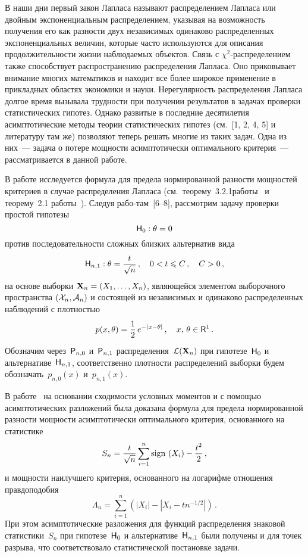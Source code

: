 \begin{multicols}{2}
В наши дни первый закон Лапласа называют
распределением Лапласа или двойным экспоненциальным распределением,
указывая на возможность получения его как разности двух независимых
одинаково распределенных экспоненциальных величин, которые часто
используются для описания продолжительности жизни наблюдаемых
объектов. Связь с $\chi^2$-распределением также способствует
распространению распределения Лапласа. Оно приковывает внимание
многих математиков и находит все более широкое применение в
прикладных областях экономики и науки. Нерегулярность распределения
Лапласа долгое время вызывала трудности при получении результатов в
задачах проверки статистических гипотез. Однако развитые в последние
десятилетия асимптотические методы теории статистических гипотез
(см.~[1, 2, 4, 5] и литературу там же) позволяют теперь решать многие
из таких задач. Одна из них~--- задача о потере мощности
асимптотически оптимального критерия~--- рас\-смат\-ри\-ва\-ет\-ся в данной
работе.

В работе исследуется формула для предела нормированной разности
мощностей критериев в случае распределения Лапласа (см.\
теорему~3.2.1\linebreak работы~\cite{1ben} и теорему~2.1 работы~\cite{2ben}). Следуя
рабо-\linebreak там~[6--8],
рассмотрим задачу проверки простой гипотезы
\begin{equation}
{\sf H}_0:\theta=0  
\label{e1.1}
\end{equation}
против последовательности сложных близких альтернатив вида
\begin{equation*}
{\sf H}_{n,1}: \theta = \displaystyle\frac{\displaystyle t\mathstrut}{\displaystyle \sqrt{n}\mathstrut}\,,\quad  0<t\leqslant C\,,\quad
C>0\,,
\end{equation*}
на основе выборки ${\bf X}_n = (X_1,\ldots,X_n)$, являющейся элементом
выборочного пространства $({\cal{X}}_n,{\cal{A}}_n)$ и
состоящей из независимых и одинаково распределенных наблюдений с плотностью
$$
p(x,\theta)=\displaystyle\frac{\displaystyle 1\mathstrut}{\displaystyle 2\mathstrut}\,e^{-\left| x-\theta\right| }\,,\quad x,\,\theta\in {\sf R}^1\,.
$$
Обозначим через~${{\sf P}}_{n,0}$ и~${{\sf P}}_{n,1}$ распределения~${\cal
L}({\bf X}_n)$ при гипотезе~${\sf H}_0$ и альтернативе~${\sf
H}_{n,1}$, соответственно плотности распределений выборки будем
обозначать~$p_{n,0}(x)$ и~$p_{n,1}(x)$.

В работе~\cite{5ben} на основании сходимости условных моментов и с помощью
асимптотических разложений была доказана формула для предела
нормированной разности мощности асимптотически оптимального
критерия, основанного на статистике
\begin{equation}
S_n=\displaystyle\frac{\displaystyle t\mathstrut}{\displaystyle \sqrt{n}\mathstrut}\sum\limits_{i=1}^{n}\mathrm{sign}\,\left(X_i\right)-\displaystyle\frac{\displaystyle t^2\mathstrut}{\displaystyle 2\mathstrut}\,,
\label{e1.3}
\end{equation}
и мощности наилучшего критерия, основанного на логарифме отношения правдоподобия
\begin{equation}
\Lambda_n=\sum\limits_{i=1}^{n}\left( |X_i| - |X_i - tn^{-1/2}| \right)\,.
\label{e1.4}
\end{equation}
При этом асимптотические разложения для функций распределения знаковой статистики~$S_n$ 
при гипотезе~${\sf H}_0$ и альтернативе~${\sf H}_{n,1}$ были получены и для точек разрыва, 
что соответствовало статистической постановке задачи.


\end{multicols}

